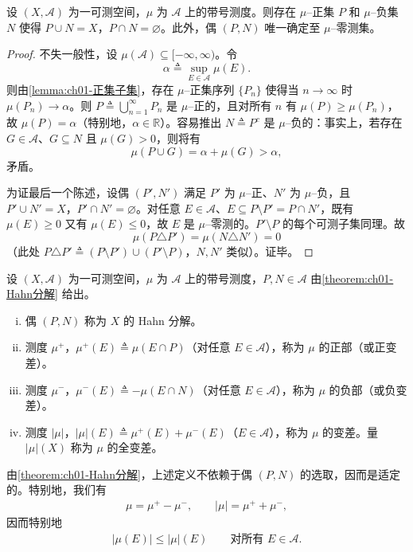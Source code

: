 \documentclass[../../main.tex]{subfiles}%
\begin{document}
\begin{theorem}[Hahn]\label{theorem:ch01-Hahn分解}
设 $(X,\mathcal{A})$ 为一可测空间，$\mu$ 为 $\mathcal{A}$ 上的带号测度。则存在 $\mu$--正集 $P$ 和 $\mu$--负集 $N$ 使得 $P\cup N=X$，$P\cap N=\varnothing $。此外，偶 $(P,N)$ 唯一确定至 $\mu$--零测集。
\end{theorem}

\begin{proof}
不失一般性，设 $\mu(\mathcal{A})\subseteq[-\infty,\infty)$。令
\[
\alpha\triangleq \sup_{E\in\mathcal{A}}\mu(E).
\]
则由\cref{lemma:ch01-正集子集}，存在 $\mu$--正集序列 $\{P_n\}$ 使得当 $n\to\infty$ 时 $\mu(P_n)\to\alpha$。则 $P\triangleq \bigcup_{n=1}^\infty P_n$ 是 $\mu$--正的，且对所有 $n$ 有 $\mu(P)\geqslant\mu(P_n)$，故 $\mu(P)=\alpha$（特别地，$\alpha\in\mathbb{R}$）。容易推出 $N\triangleq P^c$ 是 $\mu$--负的：事实上，若存在 $G\in\mathcal{A}$、$G\subseteq N$ 且 $\mu(G)>0$，则将有
\[
\mu(P\cup G)=\alpha+\mu(G)>\alpha,
\]
矛盾。

为证最后一个陈述，设偶 $(P',N')$ 满足 $P'$ 为 $\mu$--正、$N'$ 为 $\mu$--负，且 $P'\cup N'=X$，$P'\cap N'=\varnothing $。对任意 $E\in\mathcal{A}$、$E\subseteq P\setminus P'=P\cap N'$，既有 $\mu(E)\geqslant 0$ 又有 $\mu(E)\leqslant 0$，故 $E$ 是 $\mu$--零测的。$P'\setminus P$ 的每个可测子集同理。故
\[
\mu(P\triangle P')=\mu(N\triangle N')=0
\]
（此处 $P\triangle P'\triangleq (P\setminus P')\cup(P'\setminus P)$，$N,N'$ 类似）。证毕。
\end{proof}

\begin{definition}\label{definition:ch01-变差}
设 $(X,\mathcal{A})$ 为一可测空间，$\mu$ 为 $\mathcal{A}$ 上的带号测度，$P,N\in\mathcal{A}$ 由\cref{theorem:ch01-Hahn分解} 给出。
\begin{enumerate}[(i)]
\item 偶 $(P,N)$ 称为 $X$ 的 Hahn 分解。
\item 测度 $\mu^+$，$\mu^+(E)\triangleq \mu(E\cap P)$（对任意 $E\in\mathcal{A}$），称为 $\mu$ 的正部（或正变差）。
\item 测度 $\mu^-$，$\mu^-(E)\triangleq -\mu(E\cap N)$（对任意 $E\in\mathcal{A}$），称为 $\mu$ 的负部（或负变差）。
\item 测度 $|\mu|$，$|\mu|(E)\triangleq \mu^+(E)+\mu^-(E)$（$E\in\mathcal{A}$），称为 $\mu$ 的变差。量 $|\mu|(X)$ 称为 $\mu$ 的全变差。
\end{enumerate}
\end{definition}

由\cref{theorem:ch01-Hahn分解}，上述定义不依赖于偶 $(P,N)$ 的选取，因而是适定的。特别地，我们有
\begin{align}
\mu=\mu^+-\mu^-,\qquad |\mu|=\mu^++\mu^-, \label{align:ch01-Jordan分解}
\end{align}
因而特别地
\begin{align}
|\mu(E)|\leqslant|\mu|(E)\qquad\text{对所有 }E\in\mathcal{A}. \label{align:ch01-变差不等式}
\end{align}
\end{document}
